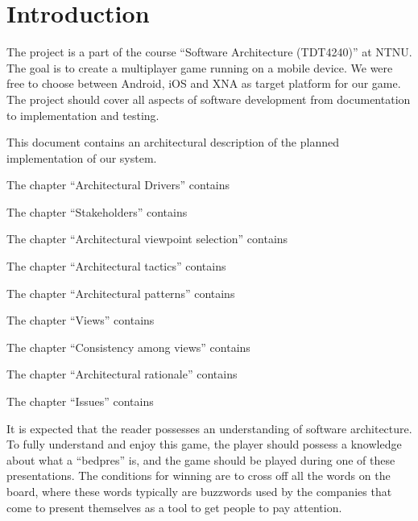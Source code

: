 \section{Introduction}
\label{sec:introduction}
The project is a part of the course ``Software Architecture (TDT4240)'' at NTNU. The goal is to create a multiplayer game running on a mobile device. We were free to choose between Android, iOS and XNA as target platform for our game. 
The project should cover all aspects of software development from documentation to implementation and testing. 

This document contains an architectural description of the planned implementation of our system.

The chapter ``Architectural Drivers'' contains

The chapter ``Stakeholders'' contains

The chapter ``Architectural viewpoint selection'' contains

The chapter ``Architectural tactics'' contains

The chapter ``Architectural patterns'' contains

The chapter ``Views'' contains

The chapter ``Consistency among views'' contains

The chapter ``Architectural rationale'' contains

The chapter ``Issues'' contains

It is expected that the reader possesses an understanding of software
architecture. To fully understand and enjoy this game, the player should
possess a knowledge about what a ``bedpres'' is, and the game should be played
during one of these presentations. The conditions for winning are to cross off
all the words on the board, where these words typically are buzzwords used by
the companies that come to present themselves as a tool to get people to pay
attention.
